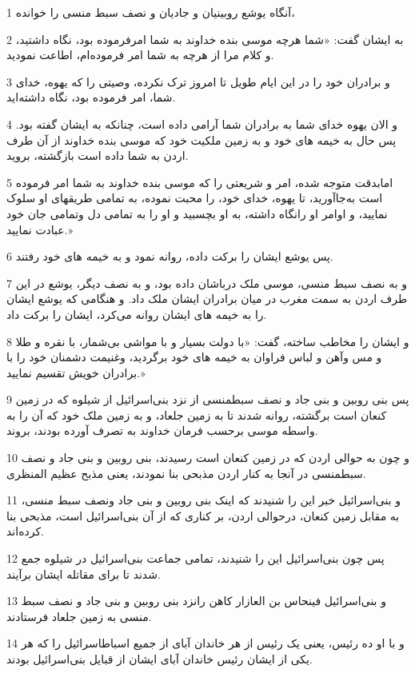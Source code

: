 \par 1 آنگاه یوشع روبینیان و جادیان و نصف سبط منسی را خوانده،
\par 2 به ایشان گفت: «شما هر‌چه موسی بنده خداوند به شما امرفرموده بود، نگاه داشتید، و کلام مرا از هر‌چه به شما امر فرموده‌ام، اطاعت نمودید.
\par 3 و برادران خود را در این ایام طویل تا امروز ترک نکرده، وصیتی را که یهوه، خدای شما، امر فرموده بود، نگاه داشته‌اید.
\par 4 و الان یهوه خدای شما به برادران شما آرامی داده است، چنانکه به ایشان گفته بود. پس حال به خیمه های خود و به زمین ملکیت خود که موسی بنده خداوند از آن طرف اردن به شما داده است بازگشته، بروید. 
\par 5 امابدقت متوجه شده، امر و شریعتی را که موسی بنده خداوند به شما امر فرموده است به‌جاآورید، تا یهوه، خدای خود، را محبت نموده، به تمامی طریقهای او سلوک نمایید، و اوامر او رانگاه داشته، به او بچسبید و او را به تمامی دل وتمامی جان خود عبادت نمایید.»
\par 6 پس یوشع ایشان را برکت داده، روانه نمود و به خیمه های خود رفتند.
\par 7 و به نصف سبط منسی، موسی ملک درباشان داده بود، و به نصف دیگر، یوشع در این طرف اردن به سمت مغرب در میان برادران ایشان ملک داد. و هنگامی که یوشع ایشان را به خیمه های ایشان روانه می‌کرد، ایشان را برکت داد.
\par 8 و ایشان را مخاطب ساخته، گفت: «با دولت بسیار و با مواشی بی‌شمار، با نقره و طلا و مس وآهن و لباس فراوان به خیمه های خود برگردید، وغنیمت دشمنان خود را با برادران خویش تقسیم نمایید.»
\par 9 پس بنی روبین و بنی جاد و نصف سبطمنسی از نزد بنی‌اسرائیل از شیلوه که در زمین کنعان است برگشته، روانه شدند تا به زمین جلعاد، و به زمین ملک خود که آن را به واسطه موسی برحسب فرمان خداوند به تصرف آورده بودند، بروند.
\par 10 و چون به حوالی اردن که در زمین کنعان است رسیدند، بنی روبین و بنی جاد و نصف سبطمنسی در آنجا به کنار اردن مذبحی بنا نمودند، یعنی مذبح عظیم المنظری.
\par 11 و بنی‌اسرائیل خبر این را شنیدند که اینک بنی روبین و بنی جاد ونصف سبط منسی، به مقابل زمین کنعان، درحوالی اردن، بر کناری که از آن بنی‌اسرائیل است، مذبحی بنا کرده‌اند.
\par 12 پس چون بنی‌اسرائیل این را شنیدند، تمامی جماعت بنی‌اسرائیل در شیلوه جمع شدند تا برای مقاتله ایشان برآیند.
\par 13 و بنی‌اسرائیل فینحاس بن العازار کاهن رانزد بنی روبین و بنی جاد و نصف سبط منسی به زمین جلعاد فرستادند.
\par 14 و با او ده رئیس، یعنی یک رئیس از هر خاندان آبای از جمیع اسباطاسرائیل را که هر یکی از ایشان رئیس خاندان آبای ایشان از قبایل بنی‌اسرائیل بودند.
